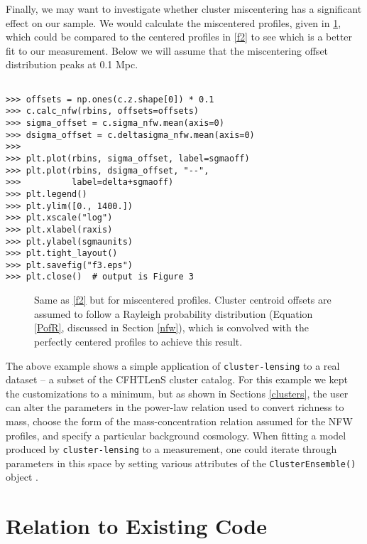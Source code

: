 \documentclass[twocolumn]{aastex6}
\newcommand{\code}{\lstinline[style=codeintext]}
\begin{document}
Finally, we may want to investigate whether cluster miscentering has a significant effect on our sample. We would calculate the miscentered profiles, given in \cref{f3}, which could be compared to the centered profiles in \cref{f2} to see which is a better fit to our measurement. Below we will assume that the miscentering offset distribution peaks at 0.1 Mpc.
\pagebreak
\begin{verbatim}

>>> offsets = np.ones(c.z.shape[0]) * 0.1
>>> c.calc_nfw(rbins, offsets=offsets)
>>> sigma_offset = c.sigma_nfw.mean(axis=0)
>>> dsigma_offset = c.deltasigma_nfw.mean(axis=0)
>>> 
>>> plt.plot(rbins, sigma_offset, label=sgmaoff)
>>> plt.plot(rbins, dsigma_offset, "--",
>>>          label=delta+sgmaoff)
>>> plt.legend()
>>> plt.ylim([0., 1400.])
>>> plt.xscale("log")
>>> plt.xlabel(raxis)
>>> plt.ylabel(sgmaunits)
>>> plt.tight_layout()
>>> plt.savefig("f3.eps")
>>> plt.close()  # output is Figure 3

\end{verbatim}
\begin{figure}
\caption{Same as \cref{f2} but for miscentered profiles. Cluster centroid offsets are assumed to follow a Rayleigh probability distribution (Equation \ref{PofR}, discussed in Section \ref{nfw}), which is convolved with the perfectly centered profiles to achieve this result.}
\label{f3}
\end{figure}

The above example shows a simple application of \code{cluster-lensing} to a real dataset -- a subset of the CFHTLenS cluster catalog.  For this example we kept the customizations to a minimum, but as shown in Sections \ref{clusters}, the user can alter the parameters in the power-law relation used to convert richness to mass, choose the form of the mass-concentration relation assumed for the NFW profiles, and specify a particular background cosmology. When fitting a model produced by \code{cluster-lensing} to a measurement, one could iterate through parameters in this space by setting various attributes of the \code{ClusterEnsemble()} object \citep[as done, e.g. in][]{Ford14, Ford15}.



\section{Relation to Existing Code}
\end{document}
